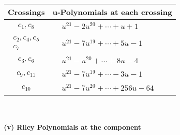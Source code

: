 \documentclass[1p]{elsarticle_modified}
\theoremstyle{definition}
\begin{document}
\begin{tabular}{m{50pt}|m{274pt}}
Crossings & \hspace{64pt}u-Polynomials at each crossing \\
\hline $$\begin{aligned}c_{1},c_{8}\end{aligned}$$&$\begin{aligned}
&u^{21}-2 u^{20}+\cdots+u+1
\end{aligned}$\\
\hline $$\begin{aligned}c_{2},c_{4},c_{5}\\c_{7}\end{aligned}$$&$\begin{aligned}
&u^{21}-7 u^{19}+\cdots+5 u-1
\end{aligned}$\\
\hline $$\begin{aligned}c_{3},c_{6}\end{aligned}$$&$\begin{aligned}
&u^{21}- u^{20}+\cdots+8 u-4
\end{aligned}$\\
\hline $$\begin{aligned}c_{9},c_{11}\end{aligned}$$&$\begin{aligned}
&u^{21}-7 u^{19}+\cdots-3 u-1
\end{aligned}$\\
\hline $$\begin{aligned}c_{10}\end{aligned}$$&$\begin{aligned}
&u^{21}-7 u^{20}+\cdots+256 u-64
\end{aligned}$\\
\hline
\end{tabular}\\~\\
\newpage\renewcommand{\arraystretch}{1}
\flushleft \textbf{(v) Riley Polynomials at the component}\newline \\
\end{document}
